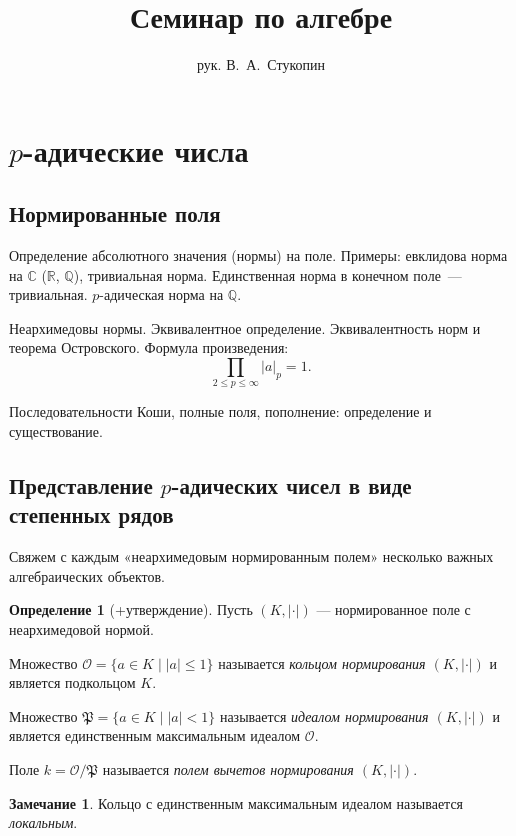 \documentclass[12pt]{scrartcl}%
\title{Семинар по алгебре}
\author{рук. В.~А.~Стукопин}
\date{}
\renewcommand{\leq}{\leqslant}
\newcommand{\OO}{\ensuremath{\mathcal O}}
\newcommand{\PP}{\ensuremath{\mathfrak P}}
\newcommand{\Q}{\ensuremath{\mathbb Q}}
\newcommand{\R}{\ensuremath{\mathbb R}}
\renewcommand{\C}{\ensuremath{\mathbb C}}
\renewcommand{\leq}{\leqslant}
\theoremstyle{remark}
\theoremstyle{definition}
\newtheorem*{Remark}{Замечание}
\newtheorem{Def}{Определение}[section]
\begin{document}
\section{$p$-адические числа}
\subsection{Нормированные поля}
Определение абсолютного значения (нормы) на поле. Примеры: евклидова норма на \C{}
(\R, \Q), тривиальная норма. Единственная норма в конечном поле~— тривиальная.
$p$-адическая норма на $\Q$.

Неархимедовы нормы. Эквивалентное определение. Эквивалентность норм и теорема
Островского. Формула произведения:
\[
    \prod_{2 \leq p \leq \infty} |a|_p = 1.
\]

Последовательности Коши, полные поля, пополнение: определение и существование.

\subsection{Представление $p$-адических чисел в виде степенных рядов}
Свяжем с каждым «неархимедовым нормированным полем» несколько важных
алгебраических объектов.

\begin{Def}[+утверждение]
Пусть $(K, |\cdot|)$ — нормированное поле с неархимедовой нормой.
\begin{compactenum}
  \item Множество $\OO = \{ a \in K \mid |a| \leq 1 \}$ называется
  \emph{кольцом нормирования $(K, |\cdot|)$} и является подкольцом $K$.
  \item Множество $\PP = \{a \in K \mid |a| < 1\}$ называется \emph{идеалом
  нормирования $(K, |\cdot|)$} и является единственным максимальным идеалом
  $\OO$.
  \item Поле $k = \OO / \PP$ называется \emph{полем вычетов нормирования
  $(K, |\cdot|)$}.
\end{compactenum}
\end{Def}

\begin{Remark}
Кольцо с единственным максимальным идеалом называется \emph{локальным}.
\end{Remark}
\end{document}
